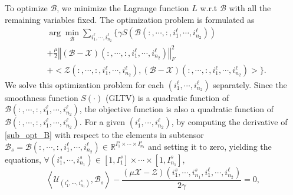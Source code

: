 \documentclass[12pt, draftcls, onecolumn]{IEEEtran}
\theoremstyle{plain}
\theoremstyle{definition}
\theoremstyle{remark}
\begin{document}
To optimize $\mathcal{B}$, we minimize the Lagrange function $L$ w.r.t $\mathcal{B}$ with all the remaining variables fixed. 
The optimization problem is formulated as
\begin{align}
\label{sub_opt_B}
	\nonumber
    &\arg\min_{\mathcal{B}}\sum_{i^{\ell}_{1},\cdots,i^{\ell}_{n_2}}\Bigg\{\gamma S\left(\mathcal{B}(:,\cdots,:,i^{\ell}_{1},\cdots,i^{\ell}_{n_2})\right)\\
    \nonumber
    &+\frac{\mu}{2}\left\Vert(\mathcal{B}-\mathcal{X})(:,\cdots,:,i^{\ell}_{1},\cdots,i^{\ell}_{n_2})\right\Vert_F^2\\
    &+\bigg<\mathcal{Z}(:,\cdots,:,i^{\ell}_{1},\cdots,i^{\ell}_{n_2}),
    (\mathcal{B}-\mathcal{X})(:,\cdots,:,i^{\ell}_{1},\cdots,i^{\ell}_{n_2})\bigg>\Bigg\}.
\end{align}
We solve this optimization problem for each $(i^{\ell}_{1},\cdots,i^{\ell}_{n_2})$ separately.
Since the smoothness function $S(\cdot)$ (GLTV) is a quadratic function of $\mathcal B(:,\cdots,:,i^{\ell}_{1},\cdots,i^{\ell}_{n_2})$, the objective function is also a quadratic function of $\mathcal B(:,\cdots,:,i^{\ell}_{1},\cdots,i^{\ell}_{n_2})$.
For a given $(i^{\ell}_{1},\cdots,i^{\ell}_{n_2})$, by computing the derivative of \eqref{sub_opt_B} with respect to the elements in subtensor $\mathcal B_s = \mathcal B(:,\cdots,:,i^{\ell}_{1},\cdots,i^{\ell}_{n_2})\in\mathbb{R}^{I^{s}_1\times\cdots\times I^{s}_{n_1}}$ and setting it to zero, yielding the equations, $\forall (i^s_1,\cdots,i^s_{n_1})\in[1,I^s_1]\times\cdots\times [1,I^s_{n_1}]$,
\begin{equation}
\label{equation_U}
\left<\mathcal{U}_{(i^s_1,\cdots,i^s_{n_1})},\mathcal{B}_s\right>-\frac{(\mu \mathcal X - \mathcal Z)(i^s_1,\cdots,i^s_{n_1},i^{\ell}_{1},\cdots,i^{\ell}_{n_2})}{2\gamma}=0,
\end{equation}
\end{document}
